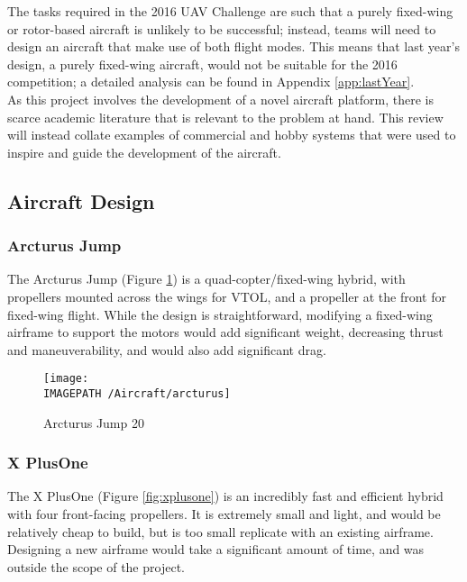 The tasks required in the 2016 UAV Challenge are such that a purely fixed-wing or rotor-based aircraft is unlikely to be successful; instead, teams will need to design an aircraft that make use of both flight modes. This means that last year's design, a purely fixed-wing aircraft, would not be suitable for the 2016 competition; a detailed analysis can be found in Appendix \ref{app:lastYear}.\\

As this project involves the development of a novel aircraft platform, there is scarce academic literature that is relevant to the problem at hand. This review will instead collate examples of commercial and hobby systems that were used to inspire and guide the development of the aircraft.\\

\subsection{Aircraft Design}
\subsubsection*{Arcturus Jump}
The Arcturus Jump \cite{ref:arcturus} (Figure \ref{fig:arcturus}) is a quad-copter/fixed-wing hybrid, with propellers mounted across the wings for VTOL, and a propeller at the front for fixed-wing flight. While the design is straightforward, modifying a fixed-wing airframe to support the motors would add significant weight, decreasing thrust and maneuverability, and would also add significant drag.

\begin{figure}[!h]
	\centering
	\texttt{[image: \\IMAGEPATH /Aircraft/arcturus]}
	\caption{Arcturus Jump 20}
	\label{fig:arcturus}
\end{figure}

\subsubsection*{X PlusOne}
The X PlusOne \cite{ref:xplusone} (Figure \ref{fig:xplusone}) is an incredibly fast and efficient hybrid with four front-facing propellers. It is extremely small and light, and would be relatively cheap to build, but is too small replicate with an existing airframe. Designing a new airframe would take a significant amount of time, and was outside the scope of the project.

